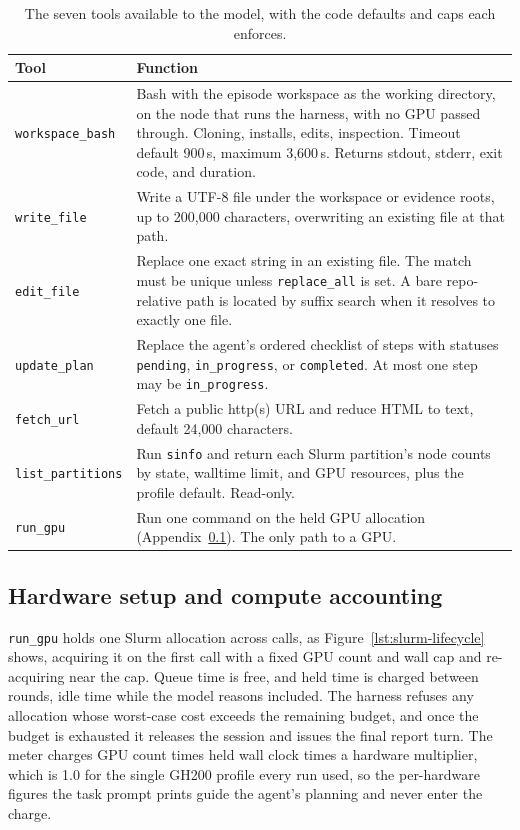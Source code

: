 \begin{table}[ht]
\centering
\small
\renewcommand{\arraystretch}{1.15}
\begin{tabular}{@{}l>{\raggedright\arraybackslash}p{9.4cm}@{}}
\toprule
Tool & Function \\
\midrule
\texttt{workspace\_bash} & Bash with the episode workspace as the working
directory, on the node that runs the harness, with no GPU passed through.
Cloning, installs, edits, inspection. Timeout default 900\,s, maximum
3{,}600\,s. Returns stdout, stderr, exit code, and duration. \\
\texttt{write\_file} & Write a UTF-8 file under the workspace or evidence roots,
up to 200{,}000 characters, overwriting an existing file at that path. \\
\texttt{edit\_file} & Replace one exact string in an existing file. The match
must be unique unless \texttt{replace\_all} is set. A bare repo-relative path is
located by suffix search when it resolves to exactly one file. \\
\texttt{update\_plan} & Replace the agent's ordered checklist of steps with
statuses \texttt{pending}, \texttt{in\_progress}, or \texttt{completed}. At most
one step may be \texttt{in\_progress}. \\
\texttt{fetch\_url} & Fetch a public http(s) URL and reduce HTML to text,
default 24{,}000 characters. \\
\texttt{list\_partitions} & Run \texttt{sinfo} and return each Slurm partition's
node counts by state, walltime limit, and GPU resources, plus the profile
default. Read-only. \\
\texttt{run\_gpu} & Run one command on the held GPU allocation
(Appendix~\ref{app:gpu-metering}). The only path to a GPU. \\
\bottomrule
\end{tabular}
\caption{The seven tools available to the model, with the code defaults and
caps each enforces.}
\label{tab:tools}
\end{table}

\subsection{Hardware setup and compute accounting}
\label{app:gpu-metering}

\texttt{run\_gpu} holds one Slurm allocation across calls, as
Figure~\ref{lst:slurm-lifecycle} shows, acquiring it on the first call with a
fixed GPU count and wall cap and re-acquiring near the cap. Queue time is free,
and held time is charged between rounds, idle time while the model reasons
included. The harness refuses any allocation whose worst-case cost exceeds the
remaining budget, and once the budget is exhausted it releases the session and
issues the final report turn. The meter charges GPU count times held wall clock
times a hardware multiplier, which is 1.0 for the single GH200 profile every run
used, so the per-hardware figures the task prompt prints guide the agent's
planning and never enter the charge.

